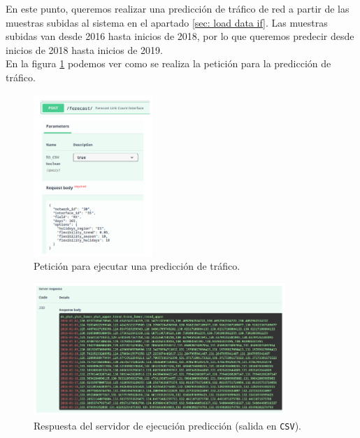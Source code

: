 \documentclass[a4paper, oneside, 12pt]{book}
\begin{document}
	\noindent En este punto, queremos realizar una predicción de tráfico de red a partir de las muestras subidas al sistema en el apartado \ref{sec: load data if}. Las muestras subidas van desde 2016 hasta inicios de 2018, por lo que queremos predecir desde inicios de 2018 hasta inicios de 2019. \\
	
	\noindent En la figura \ref{img: request forecast validate} podemos ver como se realiza la petición para la predicción de tráfico. 
	
	\begin{figure}[h!]
		\begin{center}
			\includegraphics[width=0.4\textwidth]{diag/request_forecast_validate1.png}
			\caption{Petición para ejecutar una predicción de tráfico.}
			\label{img: request forecast validate}
		\end{center}
	\end{figure}

	\begin{figure}[h!]
		\begin{center}
			\includegraphics[width=0.85\textwidth]{diag/output_forecast_validate_csv.png}
			\caption{Respuesta del servidor de ejecución predicción (salida en \texttt{CSV}).}
			\label{img: output forecast validate csv}
		\end{center}
	\end{figure}
	
\end{document}
